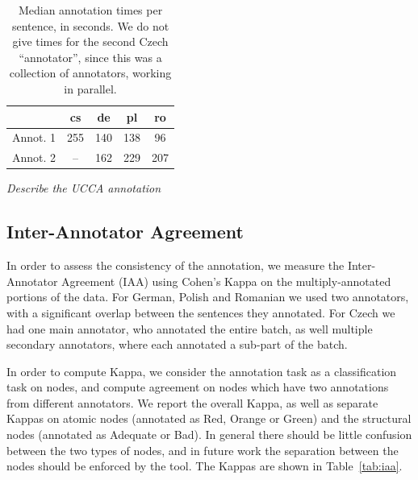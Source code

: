 \documentclass[11pt]{article}
\newcommand{\tabref}[1]{Table~\ref{#1}}
\newcommand{\oa}[1]{}
\begin{document}
\begin{table}
\begin{center}
\begin{tabular}{l|cccc}
& cs & de & pl & ro \\
\hline
Annot. 1 & 255 & 140  & 138 & 96 \\
Annot. 2 & -- & 162 & 229 & 207 \\
\end{tabular}
\caption{Median annotation times per sentence, in seconds.
We do not give times for the second Czech 
``annotator'', since this was a collection of annotators, working in parallel.}
\label{tab:annot_times}
\end{center}
\end{table}


\emph{Describe the UCCA annotation}


\subsection{Inter-Annotator Agreement}
\label{sec:iaa}

\oa{what is the purpose of the BLEU binning? is it because low quality and high
quality translations often diverge in their agreement scores?}

In order to assess the consistency of the annotation, we measure the Inter-Annotator
Agreement (IAA) using Cohen's Kappa on the multiply-annotated portions of the data.
For German, Polish and Romanian we used two annotators, with a significant overlap
between the sentences they annotated. For Czech we had one main annotator, who
annotated the entire batch, as well multiple secondary annotators, where
each annotated a sub-part of the batch. \oa{i editted it. is what i wrote correct?}

In order to compute Kappa, we consider the annotation task as a classification task on 
nodes, and compute agreement on nodes which have two annotations from different annotators.
We report the overall Kappa, as well as separate Kappas on atomic
nodes (annotated as Red, Orange or Green) and the structural nodes (annotated
as Adequate or Bad). In general there should be little confusion between the two
types of nodes, and in future work the separation between the nodes should be enforced
by the tool\oa{but there may be some disagreement in the margins on what nodes are atomic and
  what are not}. The Kappas are shown in \tabref{tab:iaa}.
\end{document}
